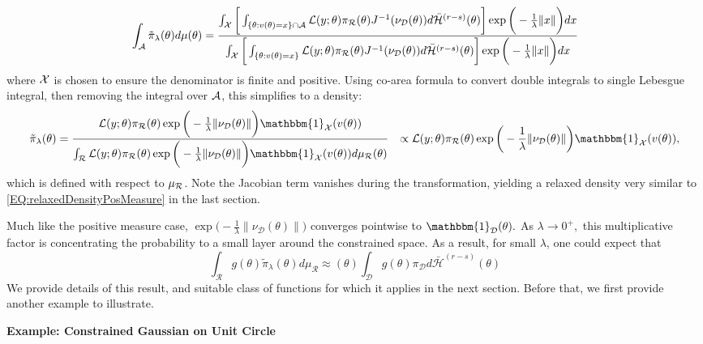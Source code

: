 \documentclass[10pt,fleqn]{article} \pdfoutput=1
\DeclareMathOperator{\1}{\mathbbm{1}} \DeclareMathOperator{\bigO}{\mc O}
\begin{document}
$$\int_{\mathcal{A}} \tilde{\pi}_\lambda(\theta) d \mu(\theta)=
\frac{\int_{\mathcal{X}} \bigg[ \int_{ \{\theta:v(\theta)=x\}\cap \mathcal{A} }
	{\mathcal{L}(y;\theta)\pi_\mathcal{R}(\theta)}{J^{-1}(\nu_\mathcal{D}(\theta))}
d\bar{\mathcal{H}}^{(r-s)}(\theta) \bigg]
\exp\bigg(-\frac{1}{\lambda}\|x\|\bigg )dx
}
{\int_{\mathcal{X}} \bigg[ \int_{\{\theta:v(\theta)=x\}}
	{\mathcal{L}(y;\theta)\pi_\mathcal{R}(\theta)}{J^{-1}(\nu_\mathcal{D}(\theta))}
d\bar{\mathcal{H}}^{(r-s)}(\theta) \bigg]
\exp\bigg(-\frac{1}{\lambda}\|x\|\bigg )dx
}$$ 
where $\mathcal{X}$ is chosen to ensure the denominator is finite and
positive. Using co-area formula \citep{federer2014geometric} to convert
double integrals to single Lebesgue integral, then removing
the integral over $\mathcal{A}$, this simplifies to a density:
\begin{equation}
 \begin{split} 
\label{EQ:relaxedDensityZeroMeasure} 
 \tilde{\pi}_\lambda(\theta) &=
		\dfrac{\mathcal{L}(y;\theta)
			\pi_\mathcal{R}(\theta)\exp\bigg(-\frac{1}{\lambda}\|\nu_\mathcal{D}(\theta)\|\bigg)  
			\mathbbm{1}_{\mc X}(v(\theta))
			}{\int_\mathcal{R} 
			\mathcal{L}(y;\theta)
			\pi_\mathcal{R}(\theta)\exp\bigg(-\frac{1}{\lambda}\|\nu_\mathcal{D}(\theta)\|\bigg) \mathbbm{1}_{\mc X}(v(\theta))
			d\mu_\mathcal{R}(\theta) } & \propto \mathcal{L}(y;\theta)
		\pi_\mathcal{R}(\theta)\exp\bigg(-\frac{1}{\lambda}\|\nu_\mathcal{D}(\theta)\|\bigg) \mathbbm{1}_{\mc X}(v(\theta)),
	\end{split} \end{equation}
which is defined with respect to $\mu_{\mathcal{R}}$. Note the Jacobian term
vanishes during the transformation, yielding a relaxed density very similar
to \eqref{EQ:relaxedDensityPosMeasure} in the last section. 

Much like the positive measure case,
$\exp\bigg(-\frac{1}{\lambda}\|\nu_\mathcal{D}(\theta)\|\bigg)$ converges
pointwise to $\mathbbm{1}_\mathcal{D}(\theta).$ As $\lambda\to0^+,$ this
multiplicative factor is concentrating the probability to a small layer
around the constrained space. As a result, for small $\lambda$, one could
 expect that
$$ \int_\mathcal{R} g(\theta)
	\tilde{\pi}_\lambda(\theta) d\mu_\mathcal{R}
	\approx
	(\theta)\int_\mathcal{D} g(\theta) \pi_\mathcal{D}
	d\bar{\mathcal{H}}^{(r-s)}(\theta) $$
We provide details of this result, and suitable class of
functions for which it applies in the next section.
Before that, we first
provide another example to illustrate.

\textbf{Example: Constrained Gaussian on Unit Circle} 
\end{document}
